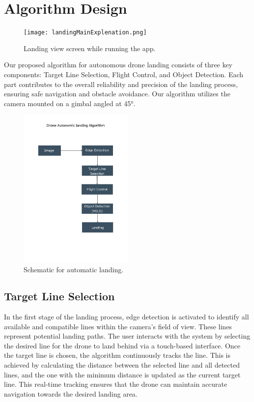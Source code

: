 \documentclass[unnumsec,webpdf,modern,large]{mam-authoring-template}%
\begin{document}
\section{Algorithm Design} \label{sec:algorithm}
\begin{figure}[H]
    \centering
    \texttt{[image: landingMainExplenation.png]}  %
    \caption{Landing view screen while running the app.}
    \label{fig:landingMainExplenation.}
\end{figure}
Our proposed algorithm for autonomous drone landing consists of three key components: Target Line Selection, Flight Control, and Object Detection. Each part contributes to the overall reliability and precision of the landing process, ensuring safe navigation and obstacle avoidance.
Our algorithm utilizes the camera mounted on a gimbal angled at 45°.
\begin{figure}[H]
    \centering
    \includegraphics[width=0.5\textwidth]{Schematic_for_automatic_landing.png}  %
    \caption{Schematic for automatic landing.}
    \label{fig:Schematic_for_automatic_landing.}
\end{figure}

\subsection{Target Line Selection}
In the first stage of the landing process, edge detection is activated to identify all available and compatible lines within the camera's field of view. These lines represent potential landing paths. The user interacts with the system by selecting the desired line for the drone to land behind via a touch-based interface. Once the target line is chosen, the algorithm continuously tracks the line. This is achieved by calculating the distance between the selected line and all detected lines, and the one with the minimum distance is updated as the current target line. This real-time tracking ensures that the drone can maintain accurate navigation towards the desired landing area.
\end{document}
